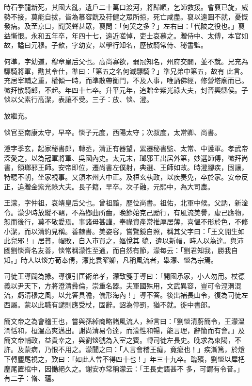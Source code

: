 \begin{pinyinscope}
 時石季龍新死，其國大亂，遺戶二十萬口渡河，將歸順，乞師救援。會裒已旋，威勢不接，莫能自拔，皆為慕容皝及苻健之眾所掠，死亡咸盡。裒以遠圖不就，憂慨發病。及至京口，聞哭聲甚眾，裒問：「何哭之多？」左右曰：「代陂之役也。」裒益慚恨。永和五年卒，年四十七，遠近嗟悼，吏士哀慕之。贈侍中、太傅，本官如故，謚曰元穆。子歆，字幼安，以學行知名，歷散騎常侍、秘書監。



 何準，字幼道，穆章皇后父也。高尚寡欲，弱冠知名，州府交闢，並不就。兄充為驃騎將軍，勸其令仕，準曰：「第五之名何滅驃騎？」準兄弟中第五，故有
 此言。充居宰輔之重，權傾一時，而準散帶衡門，不及人事，唯誦佛經，修營塔廟而已。徵拜散騎郎，不起。年四十七卒。升平元年，追贈金紫光祿大夫，封晉興縣侯。子惔以父素行高潔，表讓不受。三子：放、惔、澄。



 放繼充。



 惔官至南康太守，早卒。惔子元度，西陽太守；次叔度，太常卿、尚書。



 澄字季玄，起家秘書郎，轉丞，清正有器望，累遷秘書監、太常、中護軍。孝武帝深愛之，以為冠軍將軍、吳國內史。太元末，瑯邪王出居外第，妙選師傅，徵拜尚書，領瑯邪王師。安帝即位，遷尚書左僕射，典選、王師如故。時澄腳疾，固讓，特聽不朝，坐家視事。又領本州大中正。及桓玄執政，以疾奏免，卒於家。安帝反正，追贈金紫光祿大夫。長子籍，早卒。次子融，元熙中，為大司農。



 王濛，字仲祖，哀靖皇后父也。曾祖黯，歷位尚書。祖佑，北軍中候。父訥，新淦令。濛少時放縱不羈，不為鄉曲所齒，晚節始克己勵行，有風流美譽，虛己應物，恕而後行，莫不敬愛焉。事諸母甚謹，奉祿資產常推厚居薄，喜慍不形於色，不修小潔，而以清約見稱。善隸書。美姿容，嘗覽鏡自照，稱其父字曰：「王文開生如此兒邪！」居貧，帽敗，自入市買之，嫗悅其
 貌，遺以新帽，時人以為達。與沛國劉惔齊名友善，惔常稱濛性至通，而自然有節，濛每云：「劉君知我，勝我自知。」時人以惔方荀奉倩，濛比袁曜卿，凡稱風流者，舉濛、惔為宗焉。



 司徒王導闢為掾。導復引匡術弟孝，濛致箋于導曰：「開國承家，小人勿用。杖德義以尹天下，方將澄清彞倫，崇重名器。夫軍國殊用，文武異容，豈可令涇渭混流，虧清穆之風，以允答具瞻，儀形海內！」導不答。後出補長山令，復為司徒左西屬。蒙以此職有譴則應受杖，固辭。詔為停罰，猶不就。徙中書郎。



 簡文帝之為會稽王也，嘗與孫綽商略諸風流人，綽言曰：「劉惔清蔚簡令，王濛溫潤恬和，桓溫高爽邁出。謝尚清易令達，而濛性和暢，能言理，辭簡而有會。」及簡文帝輔政，益貴幸之，與劉惔號為入室之賓。轉司徒左長史。晚求為東陽，不許。及蒙病，乃恨不用之。濛聞之曰：「人言會稽王癡，竟癡也！」疾漸篤，於燈下轉麈尾視之，歎曰：「如此人曾不得四十也！」年三十九卒。臨殯，劉惔以犀杷麈尾置棺中，因慟絕久之。謝安亦常稱濛云：「王長史語甚不
 多，可謂有令音。」有二子：脩、蘊。




\end{pinyinscope}
